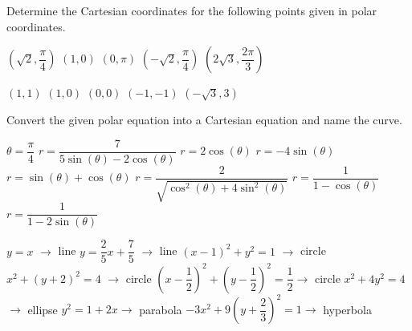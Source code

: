 \begin{Exercise}[difficulty = 1] Determine the Cartesian coordinates for the following points given in polar coordinates. 
		\begin{multicols}{3}
			\Question $\left( \sqrt{2}, \dfrac{\pi}{4} \right)$
			\Question $\left(1,0 \right)$
			\Question $(0, \pi)$
			\Question $\left( -\sqrt{2}, \dfrac{\pi}{4} \right)$
			\Question $\left(2 \sqrt{3}, \dfrac{2\pi}{3} \right)$
			\EndCurrentQuestion
		\end{multicols}

\end{Exercise}

\begin{Answer}\phantom{}
    
		\begin{multicols}{3}
			\Question $\left( 1,1\right)$
			\Question $\left(1,0 \right)$
			\Question $(0, 0)$
			\Question $\left( -1, -1 \right)$
			\Question $\left(- \sqrt{3}, 3 \right)$
			\EndCurrentQuestion
		\end{multicols}
\end{Answer}

\begin{Exercise} Convert the given polar equation into a Cartesian equation and name the curve. 
		\begin{multicols}{2}
			\Question[difficulty = 1] $\theta = \dfrac{\pi}{4}$
			\Question[difficulty = 1] $r = \dfrac{7}{5 \sin (\theta) - 2\cos (\theta)}$ 
			\Question[difficulty = 1] $r=2\cos(\theta)$ 
			\Question[difficulty = 1] $r = -4 \sin(\theta)$ 				
			\Question[difficulty = 1] $r = \sin (\theta) + \cos (\theta)$
			\ifanalysis\Question[difficulty = 1]\fi\ifcalculus\Question[difficulty = 2]\fi $r = \dfrac{2}{\sqrt{\cos^2 (\theta) + 4 \sin^2 (\theta)}}$
			\Question[difficulty = 2] $r = \dfrac{1}{1- \cos (\theta)}$
			\Question[difficulty = 2] $r = \dfrac{1}{1- 2\sin (\theta)}$
	        \EndCurrentQuestion
		\end{multicols}

\end{Exercise}

\begin{Answer}\phantom{}
    
	\begin{multicols}{2}
	  \Question $y=x$ \qquad $\rightarrow $ line
    	\Question $y = \dfrac{2}{5} x +  \dfrac{7}{5}$ \qquad $\rightarrow $ line  
    	\Question $(x-1)^2+ y^2=1$ \qquad $\rightarrow $ circle
    	\Question $x^2 + (y+2)^2 = 4$ \qquad $\rightarrow $ circle 
		\Question $\left(x-\dfrac{1}{2}\right)^2 + \left(y-\dfrac{1}{2}\right)^2= \dfrac{1}{2}$\qquad $\rightarrow $ circle
		\Question $x^2+4y^2=4$\qquad $\rightarrow $ ellipse
		\Question $y^2 = 1+2x$\qquad $\rightarrow $ parabola
		\Question $-3 x^2 + 9 \left( y + \dfrac{2}{3} \right)^2 = 1$\qquad $\rightarrow $ hyperbola
		\EndCurrentQuestion
	\end{multicols}
\end{Answer}
	
